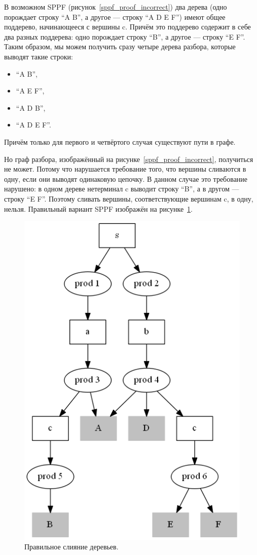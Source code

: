 В возможном SPPF (рисунок~\ref{sppf_proof_incorrect}) два дерева (одно порождает строку ``A B'', а другое --- строку ``A D E F'') имеют общее поддерево, начинающееся с вершины c. Причём это поддерево содержит в себе два разных поддерева: одно порождает строку ``B'', а другое --- строку ``E F''. Таким образом, мы можем получить сразу четыре дерева разбора, которые выводят такие строки:
\begin{itemize}
\item ``A B'',
\item ``A E F'',
\item ``A D B'',
\item ``A D E F''.
\end{itemize}

Причём только для первого и четвёртого случая существуют пути в графе. 

Но граф разбора, изображённый на рисунке~\ref{sppf_proof_incorrect}, получиться не может. Потому что нарушается требование того, что вершины сливаются в одну, если они выводят одинаковую цепочку. В данном случае это требование нарушено: в одном дереве нетерминал c выводит строку ``B'', а в другом --- строку ``E F''. Поэтому сливать вершины, соответствующие вершинам c, в одну, нельзя. Правильный вариант SPPF изображён на рисунке~\ref{sppf_proof_correct}.

\begin{figure}[t]
\centering
\includegraphics[width=0.5\linewidth]{Ivanov/Pictures/proof_correct_merge.png}
\caption{Правильное слияние деревьев.}
\label{sppf_proof_correct}
\end{figure}

